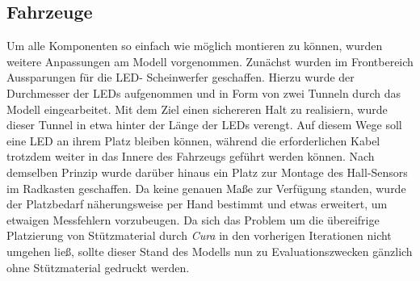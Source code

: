 \documentclass[.../Dokumentation.tex]{subfiles}
\begin{document}
\subsection{Fahrzeuge}\label{sec-ita3-cars}
Um alle Komponenten so einfach wie möglich montieren zu können, wurden 
weitere Anpassungen am Modell vorgenommen. 
Zunächst wurden im Frontbereich Aussparungen für die LED-\grqq 
Scheinwerfer\grqq{} geschaffen. Hierzu wurde der Durchmesser der LEDs 
aufgenommen und in Form von zwei \grqq Tunneln\grqq{} durch das Modell 
eingearbeitet. Mit dem Ziel einen sichereren Halt zu realisiern, wurde dieser 
Tunnel in etwa hinter der Länge der LEDs verengt. Auf diesem Wege soll eine 
LED an ihrem Platz bleiben können, während die erforderlichen Kabel trotzdem 
weiter in das Innere des Fahrzeugs geführt werden können.
Nach demselben Prinzip wurde darüber hinaus ein Platz zur Montage des 
Hall-Sensors im Radkasten geschaffen. Da keine genauen Maße zur Verfügung 
standen, wurde der Platzbedarf näherungsweise per Hand bestimmt und etwas 
erweitert, um etwaigen Messfehlern vorzubeugen.
Da sich das Problem um die übereifrige Platzierung von Stützmaterial durch 
\textit{Cura} in den vorherigen Iterationen nicht umgehen ließ, sollte 
dieser Stand des Modells nun zu Evaluationszwecken gänzlich ohne Stützmaterial 
gedruckt werden.
\end{document}
